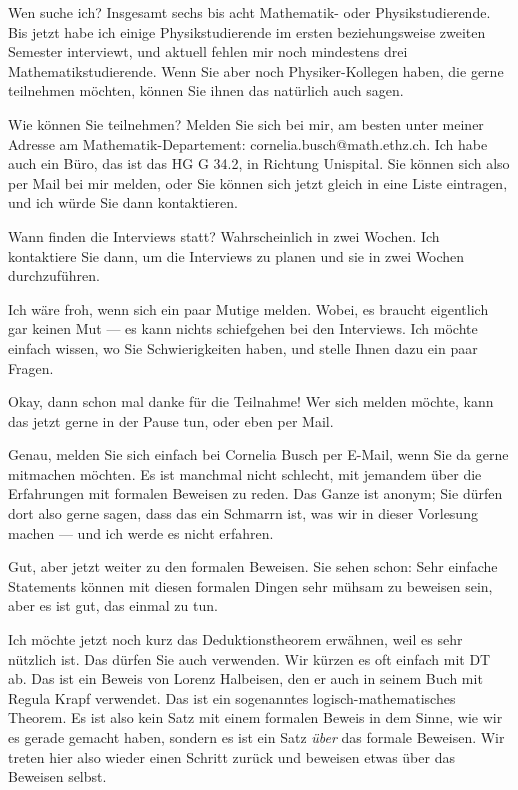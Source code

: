 \begin{spoken-clean}[00:45:15 - 00:47:22]
Wen suche ich? Insgesamt sechs bis acht Mathematik- oder Physikstudierende. Bis jetzt habe ich einige Physikstudierende im ersten beziehungsweise zweiten Semester interviewt, und aktuell fehlen mir noch mindestens drei Mathematikstudierende. Wenn Sie aber noch Physiker-Kollegen haben, die gerne teilnehmen möchten, können Sie ihnen das natürlich auch sagen.

Wie können Sie teilnehmen? Melden Sie sich bei mir, am besten unter meiner Adresse am Mathematik-Departement: cornelia.busch@math.ethz.ch. Ich habe auch ein Büro, das ist das HG G 34.2, in Richtung Unispital. Sie können sich also per Mail bei mir melden, oder Sie können sich jetzt gleich in eine Liste eintragen, und ich würde Sie dann kontaktieren. 

Wann finden die Interviews statt? Wahrscheinlich in zwei Wochen. Ich kontaktiere Sie dann, um die Interviews zu planen und sie in zwei Wochen durchzuführen.

Ich wäre froh, wenn sich ein paar Mutige melden. Wobei, es braucht eigentlich gar keinen Mut --- es kann nichts schiefgehen bei den Interviews. Ich möchte einfach wissen, wo Sie Schwierigkeiten haben, und stelle Ihnen dazu ein paar Fragen.

Okay, dann schon mal danke für die Teilnahme! Wer sich melden möchte, kann das jetzt gerne in der Pause tun, oder eben per Mail.
\end{spoken-clean}

\begin{spoken-clean}[00:47:22 - 00:48:37]
Genau, melden Sie sich einfach bei Cornelia Busch per E-Mail, wenn Sie da gerne mitmachen möchten. Es ist manchmal nicht schlecht, mit jemandem über die Erfahrungen mit formalen Beweisen zu reden. Das Ganze ist anonym; Sie dürfen dort also gerne sagen, dass das ein Schmarrn ist, was wir in dieser Vorlesung machen --- und ich werde es nicht erfahren.

Gut, aber jetzt weiter zu den formalen Beweisen. Sie sehen schon: Sehr einfache Statements können mit diesen formalen Dingen sehr mühsam zu beweisen sein, aber es ist gut, das einmal zu tun.

Ich möchte jetzt noch kurz das Deduktionstheorem erwähnen, weil es sehr nützlich ist. Das dürfen Sie auch verwenden. Wir kürzen es oft einfach mit DT ab. Das ist ein Beweis von Lorenz Halbeisen, den er auch in seinem Buch mit Regula Krapf verwendet. Das ist ein sogenanntes logisch-mathematisches Theorem. Es ist also kein Satz mit einem formalen Beweis in dem Sinne, wie wir es gerade gemacht haben, sondern es ist ein Satz \emph{über} das formale Beweisen. Wir treten hier also wieder einen Schritt zurück und beweisen etwas über das Beweisen selbst.
\end{spoken-clean}

